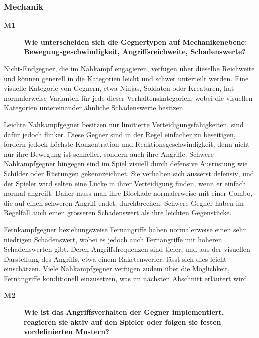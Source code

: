 \documentclass[../Main.tex]{subfiles}
\begin{document}
\subsubsection{Mechanik}

\begin{description}
  \item[\textbf{M1}] \textbf{Wie unterscheiden sich die Gegnertypen auf Mechanikenebene: Bewegungsgeschwindigkeit, Angriffsreichweite, Schadenswerte?}
\end{description}

Nicht-Endgegner, die im Nahkampf engagieren, verfügen über dieselbe Reichweite und können generell in die Kategorien leicht und schwer unterteilt werden. Eine visuelle Kategorie von Gegnern, etwa Ninjas, Soldaten oder Kreaturen, hat normalerweise Varianten für jede dieser Verhaltenskategorien, wobei die visuellen Kategorien untereinander ähnliche Schadenswerte besitzen.

Leichte Nahkampfgegner besitzen nur limitierte Verteidigungsfähigkeiten, sind dafür jedoch flinker. Diese Gegner sind in der Regel einfacher zu beseitigen, fordern jedoch höchste Konzentration und Reaktionsgeschwindigkeit, denn nicht nur ihre Bewegung ist schneller, sondern auch ihre Angriffe. Schwere Nahkampfgegner hingegen sind im Spiel visuell durch defensive Ausrüstung wie Schilder oder Rüstungen gekennzeichnet. Sie verhalten sich äusserst defensiv, und der Spieler wird selten eine Lücke in ihrer Verteidigung finden, wenn er einfach normal angreift. Daher muss man ihre Blockade normalerweise mit einer Combo, die auf einen schweren Angriff endet, durchbrechen. Schwere Gegner haben im Regelfall auch einen grösseren Schadenswert als ihre leichten Gegenstücke.

Fernkampfgegner beziehungsweise Fernangriffe haben normalerweise einen sehr niedrigen Schadenswert, wobei es jedoch auch Fernangriffe mit höheren Schadenswerten gibt. Deren Angriffsfrequenzen sind tiefer, und aus der visuellen Darstellung des Angriffs, etwa einem Raketenwerfer, lässt sich dies leicht einschätzen. Viele Nahkampfgegner verfügen zudem über die Möglichkeit, Fernangriffe konditionell einzusetzen, was im nächsten Abschnitt erläutert wird.

\begin{description}
  \item[\textbf{M2}] \textbf{Wie ist das Angriffsverhalten der Gegner implementiert, reagieren sie aktiv auf den Spieler oder folgen sie festen vordefinierten Mustern?}
\end{description}
\end{document}
